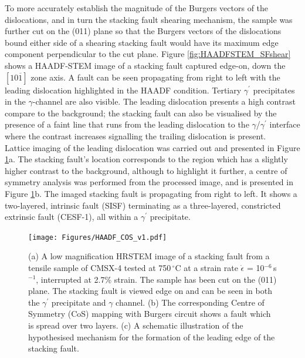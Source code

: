 \documentclass[a4paper,12pt,times,numbered,print,index]{Classes/PhDThesisPSnPDF}
\begin{document}
To more accurately establish the magnitude of the Burgers vectors of the dislocations, and in turn the stacking fault shearing mechanism, the sample was further cut on the (011) plane so that the Burgers vectors of the dislocations bound either side of a shearing stacking fault would have its maximum edge component perpendicular to the cut plane. Figure \ref{fig:HAADFSTEM_SFshear} shows a HAADF-STEM image of a stacking fault captured edge-on, down the $[10\overline{1}]$ zone axis. A fault can be seen propagating from right to left with the leading dislocation highlighted in the HAADF condition. Tertiary $\gamma^\prime$ precipitates in the $\gamma$-channel are also visible.
 The leading dislocation presents a high contrast compare to the background; the stacking fault can also be visualised by the presence of a faint line that runs from the leading dislocation to the $\gamma$/$\gamma^\prime$ interface where the contrast increases signalling the trailing dislocation is present.\\
 Lattice imaging of the leading dislocation was carried out and presented in Figure \ref{fig:haadfcos}a. The stacking fault's location corresponds to the region which has a slightly higher contrast to the background, although to highlight it further, a centre of symmetry analysis was performed from the processed image, and is presented in Figure \ref{fig:haadfcos}b. The imaged stacking fault is propagating from right to left. It shows a two-layered, intrinsic fault (SISF) terminating as a three-layered, constricted extrinsic fault (CESF-1), all within a $\gamma^\prime$ precipitate.\\
\begin{figure}
\texttt{[image: Figures/HAADF\_COS\_v1.pdf]}
\caption{(a) A low magnification HRSTEM image of a stacking fault from a tensile sample of CMSX-4 tested at 750\,$^\circ$C at a strain rate $\dot{\epsilon}$ = 10$^{-6}$\,s$^{-1}$, interrupted at 2.7\% strain. The sample has been cut on the (011) plane. The stacking fault is viewed edge on and can be seen in both the $\gamma^\prime$ precipitate and $\gamma$ channel. (b) The corresponding Centre of Symmetry (CoS) mapping with Burgers circuit shows a fault which is spread over two layers. (c) A schematic illustration of the hypothesised mechanism for the formation of the leading edge of the stacking fault.}
\label{fig:haadfcos}
\end{figure}
\end{document}

